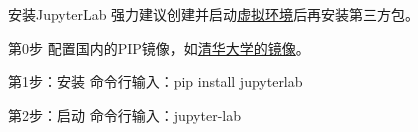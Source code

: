 \documentclass[aspectratio=169, 14pt]{beamer}
\begin{document}
\begin{frame}{安装JupyterLab}
	强力建议创建并启动\href{https://docs.python.org/3/tutorial/venv.html}{虚拟环境}后再安装第三方包。
	\begin{block}{第0步}
		配置国内的PIP镜像，如\href{https://mirrors.tuna.tsinghua.edu.cn/help/pypi/}{清华大学的镜像}。
	\end{block}
	\begin{block}{第1步：安装}
		命令行输入：pip install jupyterlab
	\end{block}
	\begin{block}{第2步：启动}
		命令行输入：jupyter-lab
	\end{block}
\end{frame}
\end{document}
